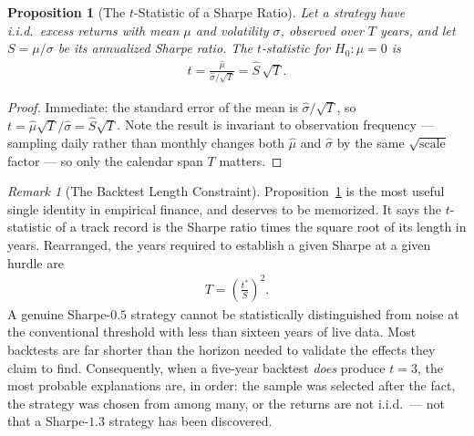 \documentclass[11pt]{article}
\theoremstyle{definition}
\theoremstyle{plain}
\newtheorem{proposition}{Proposition}[section]
\theoremstyle{remark}
\newtheorem{remark}{Remark}[section]
\begin{document}
\begin{proposition}[The $t$-Statistic of a Sharpe Ratio]\label{prop:sharpe-t}
    Let a strategy have i.i.d.\ excess returns with mean $\mu$ and volatility $\sigma$, observed over $T$ years, and let $S = \mu/\sigma$ be its annualized Sharpe ratio. The $t$-statistic for $H_0 : \mu = 0$ is
    \begin{align}
        t = \frac{\hat{\mu}}{\hat{\sigma}/\sqrt{T}} = \hat{S}\,\sqrt{T}.
    \end{align}
\end{proposition}
\begin{proof}
    Immediate: the standard error of the mean is $\hat{\sigma}/\sqrt{T}$, so $t = \hat{\mu}\sqrt{T}/\hat{\sigma} = \hat{S}\sqrt{T}$. Note the result is invariant to observation frequency --- sampling daily rather than monthly changes both $\hat\mu$ and $\hat\sigma$ by the same $\sqrt{\text{scale}}$ factor --- so only the calendar span $T$ matters.
\end{proof}

\begin{remark}[The Backtest Length Constraint]
    Proposition~\ref{prop:sharpe-t} is the most useful single identity in empirical finance, and deserves to be memorized. It says the $t$-statistic of a track record is the Sharpe ratio times the square root of its length in years. Rearranged, the years required to establish a given Sharpe at a given hurdle are
    \begin{align}
        T = \left(\frac{t^{*}}{S}\right)^{2}.
    \end{align}
    A genuine Sharpe-$0.5$ strategy cannot be statistically distinguished from noise at the conventional threshold with less than sixteen years of live data. Most backtests are far shorter than the horizon needed to validate the effects they claim to find. Consequently, when a five-year backtest \emph{does} produce $t = 3$, the most probable explanations are, in order: the sample was selected after the fact, the strategy was chosen from among many, or the returns are not i.i.d.\ --- not that a Sharpe-$1.3$ strategy has been discovered.
\end{remark}
\end{document}
